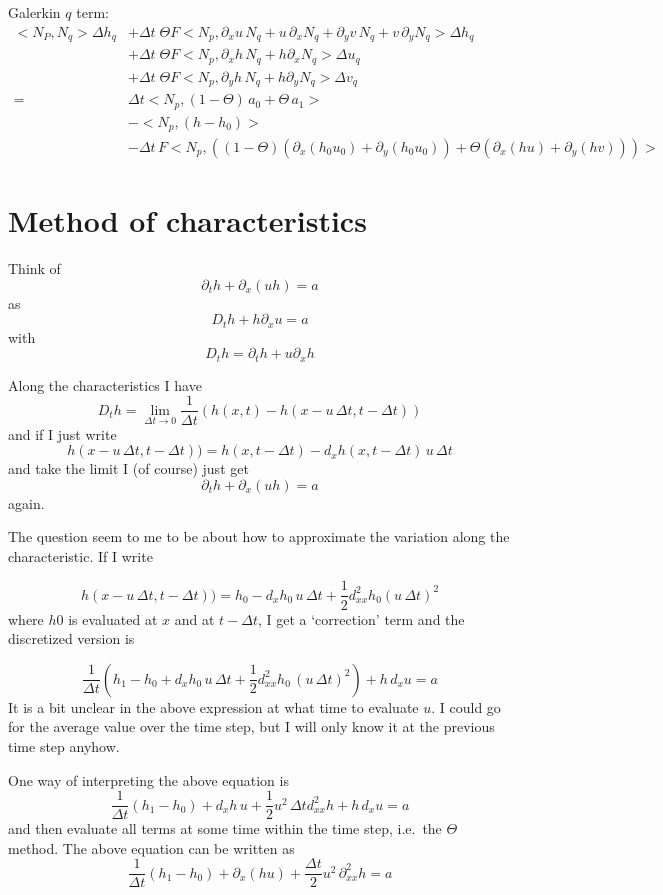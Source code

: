 \documentclass[10pt,a4paper]{book}
\newcommand{\p}{\partial}
\begin{document}
Galerkin $q$ term:
\begin{align*}
< N_P , N_q> \Delta h_q &+ \Delta t \;\Theta F < N_p ,  \p_x u \, N_q + u \, \p_x N_q  + \p_y v \, N_q + v \, \p_y N_q >  \Delta h_q \\
&+  \Delta t \;\Theta F < N_p ,  \p_x h \, N_q + h \p_x N_q  >  \Delta u_q \\
&+  \Delta t \;\Theta F < N_p ,  \p_y h \, N_q + h \p_y N_q  >  \Delta v_q \\
=&\Delta t <N_p ,  (1-\Theta) \,a_0+  \Theta \, a_1 > \\
&-< N_p , (h-h_0) > \\
&- \Delta t \, F <N_p, ( (1-\Theta)  (\p_x(h_0 u_0 ) + \p_y(h_0 u_0)) + \Theta (\p_x(h u) +\p_y(h v)))>
\end{align*}


\section{Method of characteristics}


Think of 
\[ \p_t h+\p_x( u h)=a  \]
as
\[ D_t h+ h \p_x u = a  \]
with
\[ D_t h = \p_t h + u \p_x h
\]


Along the characteristics I have
\[ D_t h= \lim_{\Delta t \to 0}\frac{1}{\Delta t} ( h(x,t) -h(x-u \, \Delta t , t-\Delta t)) \] 
and if I just write
\[
h(x-u \, \Delta t , t-\Delta t)) = h(x,t-\Delta t)- d_x h(x,t-\Delta t) \, u \, \Delta t 
\]
and take the limit I (of course) just get
\[ \p_t h+\p_x( u h)=a  \]
again.

The question seem to me to be about how to approximate the variation along the characteristic. If I write

\[
h(x-u \, \Delta t , t-\Delta t)) = h_0- d_x h_0 \, u \, \Delta t + \frac{1}{2} d^2_{xx} h_0 (u\, \Delta t)^2  
\]
where $h0$ is evaluated at $x$ and at $t-\Delta t$,
I get a `correction' term and the discretized version is

\[
\frac{1}{\Delta t} ( h_1 - h_0 + d_x h_0 \,u \, \Delta t + \frac{1}{2} d^2_{xx} h_0 \, (u\, \Delta t)^2  )+ h \, d_x u =a
\]
It is a bit unclear in the above expression at what time to evaluate
$u$. I could go for the average value over the time step, but I will
only know it at the previous time step anyhow.

One way of interpreting the above equation is 
\[
\frac{1}{\Delta t} ( h_1 - h_0 ) + d_x h \,u  + \frac{1}{2} u^2 \, \Delta t   d^2_{xx} h + h \, d_x u =a
\]
and then evaluate all terms at some time within the time step, i.e.\ the $\Theta$ method.
The above equation can be written as
\[
\frac{1}{\Delta t} ( h_1 - h_0 ) + \partial_x (h u)  + \frac{\Delta t}{2} u^2    \, \partial^2_{xx} h  =a
\]
\end{document}
